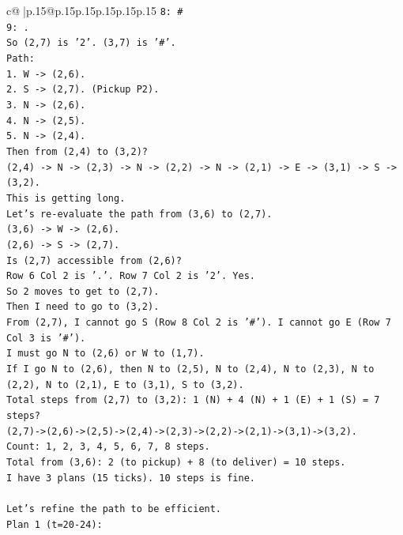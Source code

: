 \documentclass{article}
\begin{document}
{\begin{supertabular}{c@{$\;$}|p{.15\linewidth}@{}p{.15\linewidth}p{.15\linewidth}p{.15\linewidth}p{.15\linewidth}p{.15\linewidth}}
{{{\texttt{8: \#} \\
\texttt{9: .} \\
\texttt{So (2,7) is '2'. (3,7) is '\#'.} \\
\texttt{Path:} \\
\texttt{1. W {-}> (2,6).} \\
\texttt{2. S {-}> (2,7). (Pickup P2).} \\
\texttt{3. N {-}> (2,6).} \\
\texttt{4. N {-}> (2,5).} \\
\texttt{5. N {-}> (2,4).} \\
\texttt{Then from (2,4) to (3,2)?} \\
\texttt{(2,4) {-}> N {-}> (2,3) {-}> N {-}> (2,2) {-}> N {-}> (2,1) {-}> E {-}> (3,1) {-}> S {-}> (3,2).} \\
\texttt{This is getting long.} \\
\texttt{Let's re{-}evaluate the path from (3,6) to (2,7).} \\
\texttt{(3,6) {-}> W {-}> (2,6).} \\
\texttt{(2,6) {-}> S {-}> (2,7).} \\
\texttt{Is (2,7) accessible from (2,6)?} \\
\texttt{Row 6 Col 2 is '.'. Row 7 Col 2 is '2'. Yes.} \\
\texttt{So 2 moves to get to (2,7).} \\
\texttt{Then I need to go to (3,2).} \\
\texttt{From (2,7), I cannot go S (Row 8 Col 2 is '\#'). I cannot go E (Row 7 Col 3 is '\#').} \\
\texttt{I must go N to (2,6) or W to (1,7).} \\
\texttt{If I go N to (2,6), then N to (2,5), N to (2,4), N to (2,3), N to (2,2), N to (2,1), E to (3,1), S to (3,2).} \\
\texttt{Total steps from (2,7) to (3,2): 1 (N) + 4 (N) + 1 (E) + 1 (S) = 7 steps?} \\
\texttt{(2,7){-}>(2,6){-}>(2,5){-}>(2,4){-}>(2,3){-}>(2,2){-}>(2,1){-}>(3,1){-}>(3,2).} \\
\texttt{Count: 1, 2, 3, 4, 5, 6, 7, 8 steps.} \\
\texttt{Total from (3,6): 2 (to pickup) + 8 (to deliver) = 10 steps.} \\
\texttt{I have 3 plans (15 ticks). 10 steps is fine.} \\
\\ 
\texttt{Let's refine the path to be efficient.} \\
\texttt{Plan 1 (t=20{-}24):} \\
}}}
\end{supertabular}}
\end{document}
